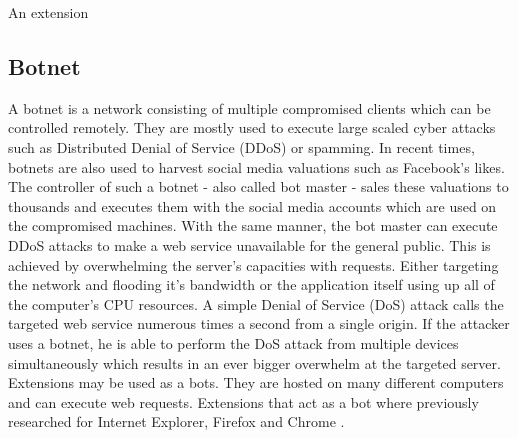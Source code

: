 	An extension %
	
	\subsection{Botnet}
	
	A botnet is a network consisting of multiple compromised clients which can be controlled remotely. They are mostly used to execute large scaled cyber attacks such as Distributed Denial of Service (DDoS) or spamming. In recent times, botnets are also used to harvest social media valuations such as Facebook's likes. The controller of such a botnet - also called bot master - sales these valuations to thousands and executes them with the social media accounts which are used on the compromised machines. With the same manner, the bot master can execute DDoS attacks to make a web service unavailable for the general public. This is achieved by overwhelming the server's capacities with requests. Either targeting the network and flooding it's bandwidth or the application itself using up all of the computer's CPU resources. A simple Denial of Service (DoS) attack calls the targeted web service numerous times a second from a single origin. If the attacker uses a botnet, he is able to perform the DoS attack from multiple devices simultaneously which results in an ever bigger overwhelm at the targeted server. \\
	
	Extensions may be used as a bots. They are hosted on many different computers and can execute web requests. 
	Extensions that act as a bot where previously researched for Internet Explorer, Firefox and Chrome \cite{liu2011botnet}.
	
	
	
